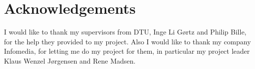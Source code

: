 \chapter{Acknowledgements}

I would like to thank my supervisors from DTU, Inge Li Gørtz and Philip Bille, for the help they provided to my project. Also I would like to thank my company Infomedia, for letting me do my project for them, in particular my project leader Klaus Wenzel Jørgensen and Rene Madsen.


